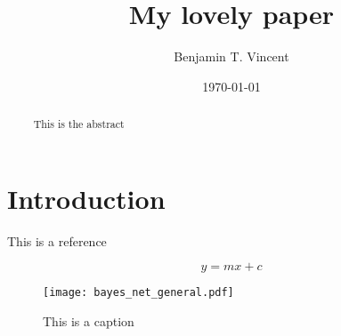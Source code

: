 \documentclass[man,12pt,a4paper,floatsintext,draftfirst]{apa6}
\title{My lovely paper}
\author{Benjamin T. Vincent}
\affiliation{School of Social Sciences, University of Dundee, UK.}
\date{\today}
\begin{document}
\maketitle

\begin{abstract}
 ~This is the abstract \lipsum[1] 
\end{abstract}

\section{Introduction}
This is a reference \citep{Vincent:2015dh}

\lipsum[1-5] %

\begin{equation}
\label{eq1}
  y = mx+c
\end{equation}

\lipsum[2] %

\begin{figure}[t!] 
	\centering
	\texttt{[image: bayes\_net\_general.pdf]} 
	\caption{This is a caption}
	\label{fig:first_figure}
\end{figure}

\lipsum[3] %

\clearpage


\end{document}
